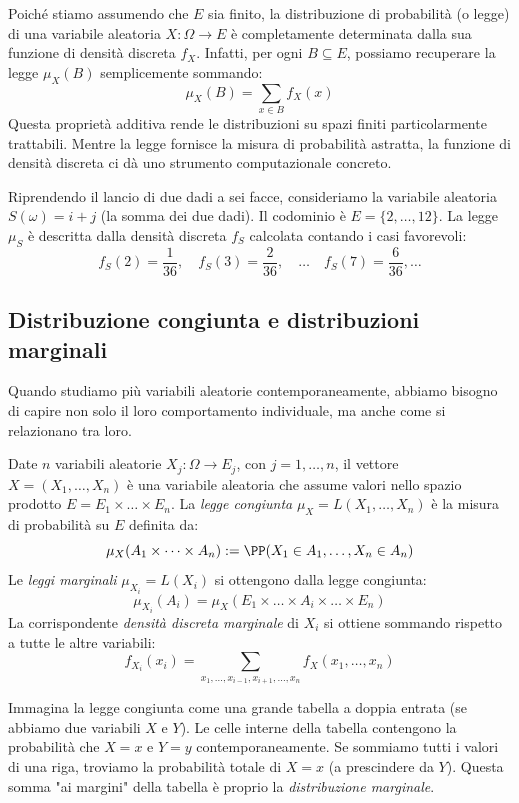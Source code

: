 Poiché stiamo assumendo che $E$ sia finito, la distribuzione di probabilità (o legge) di una variabile aleatoria $X : \Omega \to E$ è completamente determinata dalla sua funzione di densità discreta $f_X$. Infatti, per ogni $B \subseteq E$, possiamo recuperare la legge $\mu_X(B)$ semplicemente sommando:
\[ \mu_X(B) = \sum_{x \in B} f_X(x) \]
Questa proprietà additiva rende le distribuzioni su spazi finiti particolarmente trattabili. Mentre la legge fornisce la misura di probabilità astratta, la funzione di densità discreta ci dà uno strumento computazionale concreto.

\begin{esempio}
Riprendendo il lancio di due dadi a sei facce, consideriamo la variabile aleatoria $S(\omega) = i + j$ (la somma dei due dadi). Il codominio è $E = \{2, \dots, 12\}$. La legge $\mu_S$ è descritta dalla densità discreta $f_S$ calcolata contando i casi favorevoli:
\[ f_S(2) = \frac{1}{36}, \quad f_S(3) = \frac{2}{36}, \quad \dots \quad f_S(7) = \frac{6}{36}, \dots \]
\end{esempio}

\subsection{Distribuzione congiunta e distribuzioni marginali}

Quando studiamo più variabili aleatorie contemporaneamente, abbiamo bisogno di capire non solo il loro comportamento individuale, ma anche come si relazionano tra loro.

\begin{definition}
Date $n$ variabili aleatorie $X_j : \Omega \to E_j$, con $j=1,\dots,n$, il vettore $X = (X_1, \dots, X_n)$ è una variabile aleatoria che assume valori nello spazio prodotto $E = E_1 \times \dots \times E_n$.
La \emph{legge congiunta} $\mu_X = L(X_1, \dots, X_n)$ è la misura di probabilità su $E$ definita da:
\[ \mu_X(A_1 \times \dots \times A_n) := \PP(X_1 \in A_1, \dots, X_n \in A_n) \]
Le \emph{leggi marginali} $\mu_{X_i} = L(X_i)$ si ottengono dalla legge congiunta:
\[ \mu_{X_i}(A_i) = \mu_X(E_1 \times \dots \times A_i \times \dots \times E_n) \]
La corrispondente \emph{densità discreta marginale} di $X_i$ si ottiene sommando rispetto a tutte le altre variabili:
\[ f_{X_i}(x_i) = \sum_{x_1, \dots, x_{i-1}, x_{i+1}, \dots, x_n} f_X(x_1, \dots, x_n) \]
\end{definition}

\begin{spiegazione}
    Immagina la legge congiunta come una grande tabella a doppia entrata (se abbiamo due variabili $X$ e $Y$). Le celle interne della tabella contengono la probabilità che $X=x$ e $Y=y$ contemporaneamente. 
    Se sommiamo tutti i valori di una riga, troviamo la probabilità totale di $X=x$ (a prescindere da $Y$). Questa somma "ai margini" della tabella è proprio la \emph{distribuzione marginale}.
\end{spiegazione}

